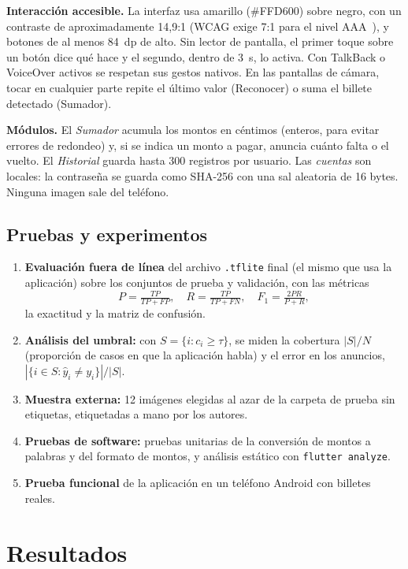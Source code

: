 \documentclass[conference,a4paper]{IEEEtran}
\begin{document}
\textbf{Interacción accesible.} La interfaz usa amarillo (\#FFD600) sobre negro, con un contraste de aproximadamente 14,9:1 (WCAG exige 7:1 para el nivel AAA~\cite{wcag22}), y botones de al menos 84~dp de alto. Sin lector de pantalla, el primer toque sobre un botón dice qué hace y el segundo, dentro de 3~s, lo activa. Con TalkBack o VoiceOver activos se respetan sus gestos nativos. En las pantallas de cámara, tocar en cualquier parte repite el último valor (Reconocer) o suma el billete detectado (Sumador).

\textbf{Módulos.} El \emph{Sumador} acumula los montos en céntimos (enteros, para evitar errores de redondeo) y, si se indica un monto a pagar, anuncia cuánto falta o el vuelto. El \emph{Historial} guarda hasta 300 registros por usuario. Las \emph{cuentas} son locales: la contraseña se guarda como SHA-256 con una sal aleatoria de 16 bytes. Ninguna imagen sale del teléfono.

\subsection{Pruebas y experimentos}

\begin{enumerate}
\item \textbf{Evaluación fuera de línea} del archivo \texttt{.tflite} final (el mismo que usa la aplicación) sobre los conjuntos de prueba y validación, con las métricas
\begin{equation}
P=\tfrac{TP}{TP+FP},\quad R=\tfrac{TP}{TP+FN},\quad F_1=\tfrac{2PR}{P+R},
\end{equation}
la exactitud y la matriz de confusión.
\item \textbf{Análisis del umbral:} con $S=\{i : c_i\geq\tau\}$, se miden la cobertura $|S|/N$ (proporción de casos en que la aplicación habla) y el error en los anuncios, $|\{i\in S : \hat{y}_i\neq y_i\}|/|S|$.
\item \textbf{Muestra externa:} 12 imágenes elegidas al azar de la carpeta de prueba sin etiquetas, etiquetadas a mano por los autores.
\item \textbf{Pruebas de software:} pruebas unitarias de la conversión de montos a palabras y del formato de montos, y análisis estático con \texttt{flutter analyze}.
\item \textbf{Prueba funcional} de la aplicación en un teléfono Android con billetes reales.
\end{enumerate}

\section{Resultados}
\end{document}
